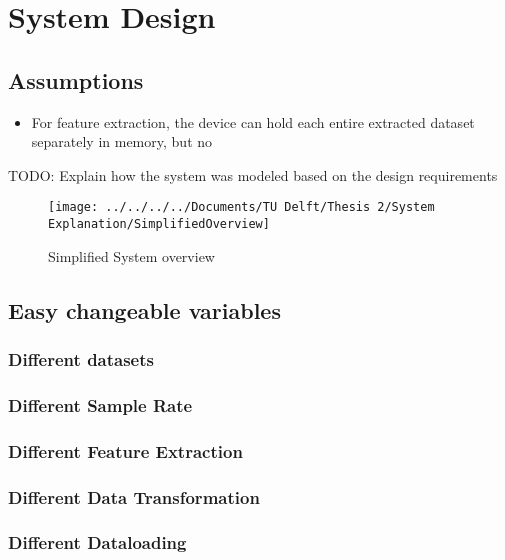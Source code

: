 \chapter{System Design}



\section{Assumptions}

\begin{itemize}
	\item For feature extraction, the device can hold each entire extracted dataset separately in memory, but no 
\end{itemize}


TODO: Explain how the system was modeled based on the design requirements

\begin{figure}[h]
	\centering
	\texttt{[image: ../../../../Documents/TU Delft/Thesis 2/System Explanation/SimplifiedOverview]}
	\caption{Simplified System overview}
\end{figure}


\section{Easy changeable variables}

\subsection{Different datasets}

\subsection{Different Sample Rate}

\subsection{Different Feature Extraction}

\subsection{Different Data Transformation}

\subsection{Different Dataloading}


